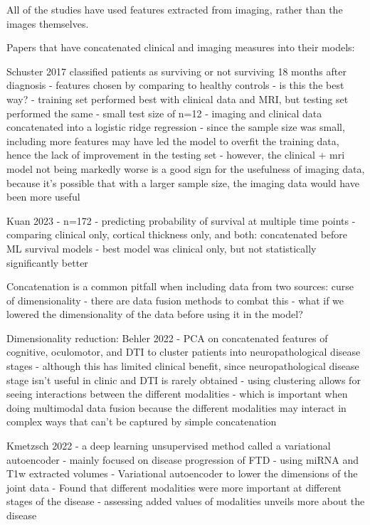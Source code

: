 All of the studies have used features extracted from imaging, rather than the images themselves.

Papers that have concatenated clinical and imaging measures into their models:

Schuster 2017 classified patients as surviving or not surviving 18 months after diagnosis
- features chosen by comparing to healthy controls - is this the best way?
- training set performed best with clinical data and MRI, but testing set performed the same
    - small test size of n=12
- imaging and clinical data concatenated into a logistic ridge regression
- since the sample size was small, including more features may have led the model to overfit the training data, hence the lack of improvement in the testing set
- however, the clinical + mri model not being markedly worse is a good sign for the usefulness of imaging data, because it's possible that with a larger sample size, the imaging data would have been more useful

Kuan 2023
- n=172
- predicting probability of survival at multiple time points
- comparing clinical only, cortical thickness only, and both: concatenated before ML survival models
- best model was clinical only, but not statistically significantly better

Concatenation is a common pitfall when including data from two sources: curse of dimensionality
- there are data fusion methods to combat this
- what if we lowered the dimensionality of the data before using it in the model?

Dimensionality reduction:
Behler 2022
- PCA on concatenated features of cognitive, oculomotor, and DTI to cluster patients into neuropathological disease stages
- although this has limited clinical benefit, since neuropathological disease stage isn't useful in clinic and DTI is rarely obtained
    - using clustering allows for seeing interactions between the different modalities
    - which is important when doing multimodal data fusion because the different modalities may interact in complex ways that can't be captured by simple concatenation

Kmetzsch 2022
- a deep learning unsupervised method called a variational autoencoder
- mainly focused on disease progression of FTD
- using miRNA and T1w extracted volumes
- Variational autoencoder to lower the dimensions of the joint data
- Found that different modalities were more important at different stages of the disease
    - assessing added values of modalities unveils more about the disease

